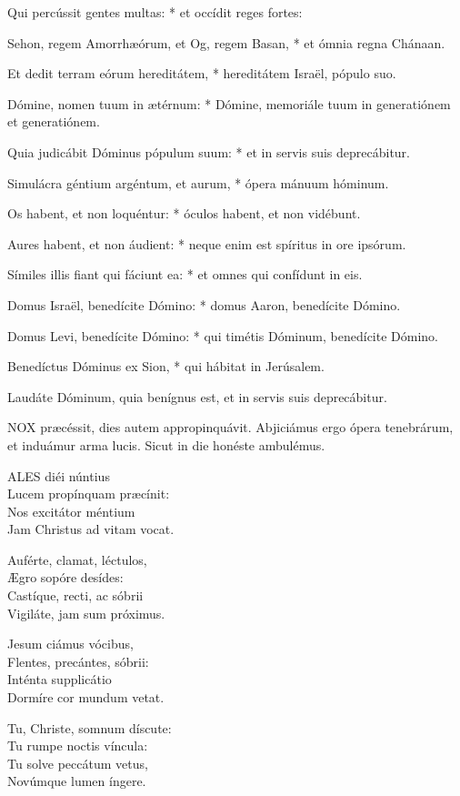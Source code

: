 Qui percússit gentes multas: * et occídit reges fortes:

Sehon, regem Amorrhæórum, et Og, regem Basan, * et ómnia regna Chánaan.

Et dedit terram eórum hereditátem, * hereditátem Israël, pópulo suo.

Dómine, nomen tuum in ætérnum: * Dómine, memoriále tuum in generatiónem et generatiónem.

Quia judicábit Dóminus pópulum suum: * et in servis suis deprecábitur.

Simulácra géntium argéntum, et aurum, * ópera mánuum hóminum.

Os habent, et non loquéntur: * óculos habent, et non vidébunt.

Aures habent, et non áudient: * neque enim est spíritus in ore ipsórum.

Símiles illis fiant qui fáciunt ea: * et omnes qui confídunt in eis.

Domus Israël, benedícite Dómino: * domus Aaron, benedícite Dómino.

Domus Levi, benedícite Dómino: * qui timétis Dóminum, benedícite Dómino.

Benedíctus Dóminus ex Sion, * qui hábitat in Jerúsalem.

 Laudáte Dóminum, quia benígnus est, et in servis suis deprecábitur.


\lettrine[lines=2]{N}{OX} præcéssit, dies autem appropinquávit. Abjiciámus ergo ópera tenebrárum, et induámur arma lucis. Sicut in die honéste ambulémus.


\lettrine[lines=2]{A}{LES} diéi núntius\\
Lucem propínquam præcínit:\\
Nos excitátor méntium\\
Jam Christus ad vitam vocat.

Auférte, clamat, léctulos,\\
Ægro sopóre desídes:\\
Castíque, recti, ac sóbrii\\
Vigiláte, jam sum próximus.

Jesum ciámus vócibus,\\
Flentes, precántes, sóbrii:\\
Inténta supplicátio\\
Dormíre cor mundum vetat.

Tu, Christe, somnum díscute:\\
Tu rumpe noctis víncula:\\
Tu solve peccátum vetus,\\
Novúmque lumen íngere.

